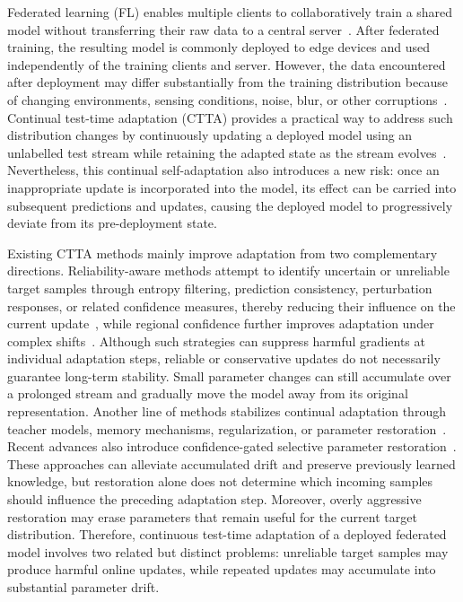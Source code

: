 \documentclass[journal]{IEEEtran}
\begin{document}
Federated learning (FL) enables multiple clients to collaboratively train a shared model without transferring their raw data to a central server~\cite{1, 2}. After federated training, the resulting model is commonly deployed to edge devices and used independently of the training clients and server. However, the data encountered after deployment may differ substantially from the training distribution because of changing environments, sensing conditions, noise, blur, or other corruptions~\cite{3}. Continual test-time adaptation (CTTA) provides a practical way to address such distribution changes by continuously updating a deployed model using an unlabelled test stream while retaining the adapted state as the stream evolves~\cite{4, 5, 6}. Nevertheless, this continual self-adaptation also introduces a new risk: once an inappropriate update is incorporated into the model, its effect can be carried into subsequent predictions and updates, causing the deployed model to progressively deviate from its pre-deployment state.

Existing CTTA methods mainly improve adaptation from two complementary directions. Reliability-aware methods attempt to identify uncertain or unreliable target samples through entropy filtering, prediction consistency, perturbation responses, or related confidence measures, thereby reducing their influence on the current update~\cite{7, 8, 9}, while regional confidence further improves adaptation under complex shifts~\cite{10}. Although such strategies can suppress harmful gradients at individual adaptation steps, reliable or conservative updates do not necessarily guarantee long-term stability. Small parameter changes can still accumulate over a prolonged stream and gradually move the model away from its original representation. Another line of methods stabilizes continual adaptation through teacher models, memory mechanisms, regularization, or parameter restoration~\cite{11, 12, 13}. Recent advances also introduce confidence-gated selective parameter restoration~\cite{14}. These approaches can alleviate accumulated drift and preserve previously learned knowledge, but restoration alone does not determine which incoming samples should influence the preceding adaptation step. Moreover, overly aggressive restoration may erase parameters that remain useful for the current target distribution. Therefore, continuous test-time adaptation of a deployed federated model involves two related but distinct problems: unreliable target samples may produce harmful online updates, while repeated updates may accumulate into substantial parameter drift.
\end{document}
